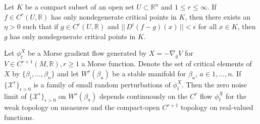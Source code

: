 \documentclass[10pt,a4paper]{amsart}
\begin{document}
\begin{lemma}
\label{lemma:good-critical-points-milnor}
    Let $K$ be a compact subset of an open set $U \subset \mathbb{R}^n$ and $1 \leq r \leq \infty$. If $f\in C^r(U,\mathbb{R})$ has only nondegenerate critical points in $K$, then there exists an $\eta >0$ such that if $g\in C^r(U,\mathbb{R})$ and $|| \, D^i(f-g)(x) \, || < \epsilon$ for all $x\in K$, then $g$ has only nondegenerate critical points in $K$.
\end{lemma}

\begin{proposition}
\label{lemma:zero-noise-continuous-dependence}
    Let $\phi^X_t$ be a Morse gradient flow generated by $X = -\nabla_g V$ for $V \in C^{r+1}(M,\mathbb{R}), r\geq1$ a Morse function. Denote the set of critical elements of $X$ by $\{ \beta_i,...,\beta_n\}$ and let $W^s(\beta_a)$ be a stable manifold for $\beta_a$, $a \in 1,...,n$. If $\{\mathcal{X}^{\epsilon}\}_{\epsilon>0}$ is a family of small random perturbations of $\phi_t^X$. Then the zero noise limit of $\{\mathcal{X}^{\epsilon}\}_{\epsilon>0}$ on $W^s(\beta_a)$ depends continuously on the $C^r$ flow $\phi^X_t$ for the weak topology on measures and the compact-open $C^{r+1}$ topology on real-valued functions.
\end{proposition}
\end{document}
